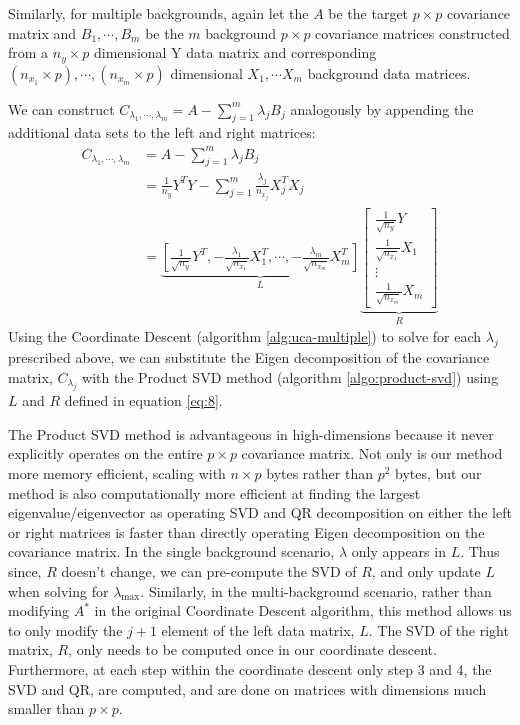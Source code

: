 \documentclass[12pt]{article}
\begin{document}
Similarly, for multiple backgrounds, again let the $A$ be the target $p \times p$ covariance matrix and $ B_1, \cdots, B_m$ be the $m$ background $p \times p$ covariance matrices constructed from a $n_y \times p$ dimensional Y data matrix and corresponding $(n_{x_1} \times p), \cdots, (n_{x_m}\times p)$ dimensional $X_1, \cdots X_m$ background data matrices.

We can construct $C_{\lambda_1, \cdots, \lambda_m} = A - \sum^{m}_{j=1}\lambda_jB_j$ analogously by appending the additional data sets to the left and right matrices:
\begin{align}
C_{\lambda_1, \cdots, \lambda_m}&= A - \sum^{m}_{j=1}\lambda_jB_j \nonumber \\
&=\frac{1}{n_y}Y^{T}Y -\sum_{j=1}^{m}{\frac{\lambda_{j}}{n_{x_j}}X_{j}^TX_{j}} \nonumber\\
     &=  \underbrace{\left[\frac{1}{\sqrt{n_y}}Y^T, -\frac{\lambda_1}{\sqrt{n_{x_{1}}}} X^T_1, \cdots, -\frac{\lambda_m}{\sqrt{n_{x_{m}}}}X^T_m\right]}_{L} \underbrace{\begin{bmatrix} \frac{1}{\sqrt{n_{y}}}Y \\ \frac{1}{\sqrt{n_{x_{1}}}}X_1 \\ \vdots \\ \frac{1}{\sqrt{n_{x_{m}}}}X_m \end{bmatrix}}_{R} \label{eq:8}
\end{align}
Using the Coordinate Descent (algorithm \ref{alg:uca-multiple}) to solve for each $\lambda_j$ prescribed above, we can substitute the Eigen decomposition of the covariance matrix, $C_{\lambda_{j}}$ with the Product SVD method (algorithm \ref{algo:product-svd}) using $L$ and $R$ defined in equation \ref{eq:8}.

 The Product SVD method is advantageous in high-dimensions because it never explicitly operates on the entire $p \times p$ covariance matrix. Not only is our method more memory efficient, scaling with $n\times p$ bytes rather than $p^2$ bytes, but our method is also computationally more efficient at finding the largest eigenvalue/eigenvector as operating SVD and QR decomposition on either the left or right matrices is faster than directly operating Eigen decomposition on the covariance matrix. In the single background scenario,  $\lambda$ only appears in $L$. Thus since, $R$ doesn't change, we can pre-compute the SVD of $R$, and only update $L$ when solving for $\lambda_{\text{max}}$.
Similarly, in the multi-background scenario, rather than modifying $A^*$ in the original Coordinate Descent algorithm, this method allows us to only modify the $j+1$ element of the left data matrix, $L$.
 The SVD of the right matrix, $R$, only needs to be computed once in our coordinate descent. Furthermore, at each step within the coordinate descent only step 3 and 4, the SVD and QR, are computed, and are done on matrices with dimensions much smaller than $p \times p$.
 
\end{document}
